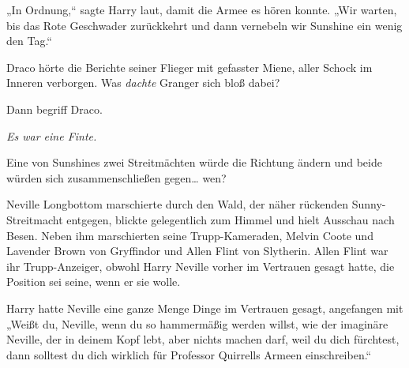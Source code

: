 „In Ordnung,“ sagte Harry laut, damit die Armee es hören konnte. „Wir warten, bis das Rote Geschwader zurückkehrt und dann vernebeln wir Sunshine ein wenig den Tag.“

\later

Draco hörte die Berichte seiner Flieger mit gefasster Miene, aller Schock im Inneren verborgen. Was \emph{dachte} Granger sich bloß dabei?

Dann begriff Draco.

\emph{Es war eine Finte.}

Eine von Sunshines zwei Streitmächten würde die Richtung ändern und beide würden sich zusammenschließen gegen… wen?

\later

Neville Longbottom marschierte durch den Wald, der näher rückenden Sunny-Streitmacht entgegen, blickte gelegentlich zum Himmel und hielt Ausschau nach Besen. Neben ihm marschierten seine Trupp-Kameraden, Melvin Coote und Lavender Brown von Gryffindor und Allen Flint von Slytherin. Allen Flint war ihr Trupp-Anzeiger, obwohl Harry Neville vorher im Vertrauen gesagt hatte, die Position sei seine, wenn er sie wolle.

Harry hatte Neville eine ganze Menge Dinge im Vertrauen gesagt, angefangen mit „Weißt du, Neville, wenn du so hammermäßig werden willst, wie der imaginäre Neville, der in deinem Kopf lebt, aber nichts machen darf, weil du dich fürchtest, dann solltest du dich wirklich für Professor Quirrells Armeen einschreiben.“

